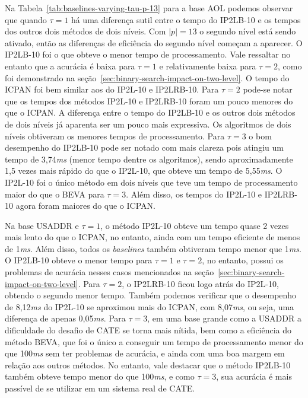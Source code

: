 Na Tabela~\ref{tab:baselines-varying-tau-p-13} para a base AOL podemos observar que quando $\tau=1$ há uma diferença sutil entre o tempo do IP2LB-10 e os tempos dos outros dois métodos de dois níveis. Com $|p|=13$ o segundo nível está sendo ativado, então as diferenças de eficiência do segundo nível começam a aparecer. O IP2LB-10 foi o que obteve o menor tempo de processamento. Vale ressaltar no entanto que a acurácia é baixa para $\tau=1$ e relativamente baixa para $\tau=2$, como foi demonstrado na seção~\ref{sec:binary-search-impact-on-two-level}. O tempo do ICPAN foi bem similar aos do IP2L-10 e IP2LRB-10. Para $\tau=2$ pode-se notar que os tempos dos métodos IP2L-10 e IP2LRB-10 foram um pouco menores do que o ICPAN. A diferença entre o tempo do IP2LB-10 e os outros dois métodos de dois níveis já aparenta ser um pouco mais expressiva. Os algoritmos de dois níveis obtiveram os menores tempos de processamento. Para $\tau=3$ o bom desempenho do IP2LB-10 pode ser notado com mais clareza pois atingiu um tempo de 3,74\textit{ms} (menor tempo dentre os algoritmos), sendo aproximadamente 1,5 vezes mais rápido do que o IP2L-10, que obteve um tempo de 5,55\textit{ms}. O IP2L-10 foi o único método em dois níveis que teve um tempo de processamento maior do que o BEVA para $\tau=3$. Além disso, os tempos do IP2L-10 e IP2LRB-10 agora foram maiores do que o ICPAN.

Na base USADDR e $\tau=1$, o método IP2L-10 obteve um tempo quase 2 vezes mais lento do que o ICPAN, no entanto, ainda com um tempo eficiente de menos de 1\textit{ms}. Além disso, todos os \textit{baselines} também obtiveram tempo menor que 1\textit{ms}. O IP2LB-10 obteve o menor tempo para $\tau=1$ e $\tau=2$, no entanto, possui os problemas de acurácia nesses casos mencionados na seção~\ref{sec:binary-search-impact-on-two-level}. Para $\tau=2$, o IP2LRB-10 ficou logo atrás do IP2L-10, obtendo o segundo menor tempo. Também podemos verificar que o desempenho de 8,12\textit{ms} do IP2L-10 se aproximou mais do ICPAN, com 8,07\textit{ms}, ou seja, uma diferença de apenas 0,05\textit{ms}. Para $\tau=3$, em uma base grande como a USADDR a dificuldade do desafio de CATE se torna mais nítida, bem como a eficiência do método BEVA, que foi o único a conseguir um tempo de processamento menor do que 100\textit{ms} sem ter problemas de acurácia, e ainda com uma boa margem em relação aos outros métodos. No entanto, vale destacar que o método IP2LB-10 também obteve tempo menor do que 100\textit{ms}, e como $\tau=3$, sua acurácia é mais passível de se utilizar em um sistema real de CATE. 

